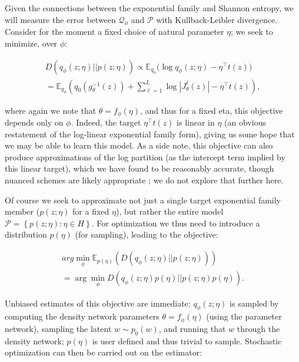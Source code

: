 \documentclass[twoside]{article}
\begin{document}
Given the connections between the exponential family and Shannon entropy, we will measure the error between $\mathcal{Q}_{\phi}$ and $\mathcal{P}$ with Kullback-Leibler divergence.  Consider for the moment a fixed choice of natural parameter $\eta$; we seek to minimize, over $\phi$:

{\small 
\begin{multline*} D\left( q_\phi(z;\eta) || p(z;\eta) \right) \propto \mathbb{E}_{q_\phi} \Bigg( \log q_\phi(z;\eta) - \eta^\top t(z) \Bigg) \\ = \mathbb{E}_{q_\phi} \left( q_0\left( g_\theta^{-1}(z)\right) + \sum_{\ell=1}^L  \log | J^\ell_\theta(z) | - \eta^\top t(z) \right),
\end{multline*} }

where again we note that $\theta = f_\phi(\eta)$, and thus for a fixed eta, this objective depends only on $\phi$.  Indeed, the target $\eta^\top t(z)$ is linear in $\eta$ (an obvious restatement of the log-linear exponential family form), giving us some hope that we may be able to learn this model.  As a side note, this objective can also produce approximations of the log partition (as the intercept term implied by this linear target), which we have found to be reasonably accurate, though nuanced schemes are likely appropriate \cite{papamakarios2015distilling}; we do not explore that further here.

Of course we seek to approximate not just a single target exponential family member ($p(z;\eta)$ for a fixed $\eta$), but rather the entire model $\mathcal{P} = \left\{p(z;\eta): \eta \in H\right\}$.   For optimization we thus need to introduce a distribution $p(\eta)$ (for sampling), leading to the objective: 

{\small 
\begin{multline*}
arg\!\min_{\!\!\!\!\!\!\!\!\!\!\!\phi} \mathbb{E}_{p(\eta)} \left( D\left( q_\phi(z;\eta) || p(z;\eta) \right)\right) \\ =  \arg\!\min_{\!\!\!\!\!\!\!\!\!\!\!\phi}  D\left( q_\phi(z;\eta)p(\eta) || p(z;\eta)p(\eta) \right). 
\end{multline*} }

Unbiased estimates of this objective are immediate: $q_\phi(z;\eta)$ is sampled by computing the density network parameters $\theta = f_\phi(\eta)$ (using the parameter network), sampling the latent $w \sim p_0(w)$, and running that $w$ through the density network; $p(\eta)$ is user defined and thus trivial to sample.  Stochastic optimization can then be carried out on the estimator:   
\end{document}
